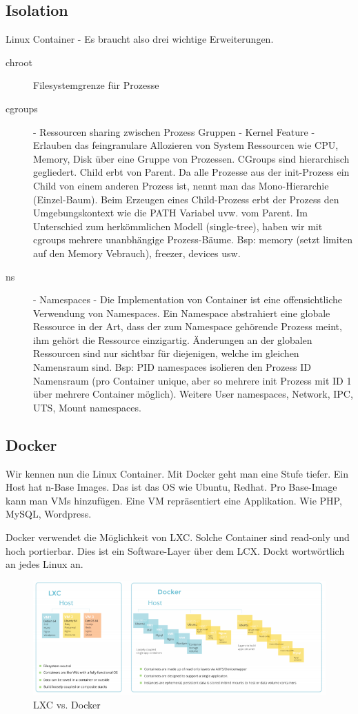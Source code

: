 \subsection{Isolation}
Linux Container - Es braucht also drei wichtige Erweiterungen.
\begin{description}
	\item[chroot] Filesystemgrenze für Prozesse
	\item[cgroups] - Ressourcen sharing zwischen Prozess Gruppen - Kernel Feature - Erlauben das feingranulare Allozieren von System Ressourcen wie CPU, Memory, Disk über eine Gruppe von Prozessen. CGroups sind hierarchisch gegliedert. Child erbt von Parent. Da alle Prozesse aus der init-Prozess ein Child von einem anderen Prozess ist, nennt man das Mono-Hierarchie (Einzel-Baum).  Beim Erzeugen eines Child-Prozess erbt der Prozess den Umgebungskontext wie die PATH Variabel uvw. vom Parent. Im Unterschied zum herkömmlichen Modell (single-tree), haben wir mit cgroups mehrere unanbhängige Prozess-Bäume. Bsp: memory (setzt limiten auf den Memory Vebrauch), freezer, devices usw.
	\item[ns] - Namespaces - Die Implementation von Container ist eine offensichtliche Verwendung von Namespaces. Ein Namespace abstrahiert eine globale Ressource in der Art, dass der zum Namespace gehörende Prozess meint, ihm gehört die Ressource einzigartig. Änderungen an der globalen Ressourcen sind nur sichtbar für diejenigen, welche im gleichen Namensraum sind. Bsp: PID namespaces isolieren den Prozess ID Namensraum (pro Container unique, aber so mehrere init Prozess mit ID 1 über mehrere Container möglich). Weitere User namespaces, Network, IPC, UTS, Mount namespaces.
\end{description} 

\newpage

\subsection{Docker}
Wir kennen nun die Linux Container. Mit Docker geht man eine Stufe tiefer. Ein Host hat n-Base Images. Das ist das OS wie Ubuntu, Redhat. Pro Base-Image kann man VMs hinzufügen. Eine VM repräsentiert eine Applikation. Wie PHP, MySQL, Wordpress.

Docker verwendet die Möglichkeit von LXC. Solche Container sind read-only und hoch portierbar. Dies ist ein Software-Layer über dem LCX. Dockt wortwörtlich an jedes Linux an.

\begin{figure}[h!]
\centering
\includegraphics[width=\linewidth]{fig/lxc-vs-docker}
\caption{LXC vs. Docker}
\label{fig:lxc-vs-docker}
\end{figure}